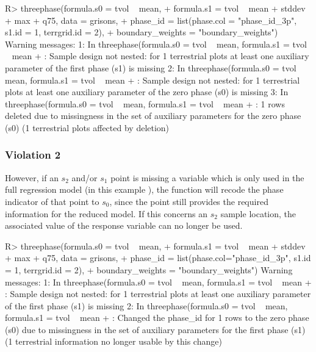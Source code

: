 \begin{small}
\begin{Schunk}
\begin{Sinput}
R> threephase(formula.s0 = tvol ~ mean, 
+    formula.s1 = tvol ~  mean + stddev + max + q75, data = grisons,
+    phase_id = list(phase.col = "phase_id_3p", s1.id = 1, terrgrid.id = 2),
+    boundary_weights = "boundary_weights")
Warning messages:
1: In threephase(formula.s0 = tvol ~ mean, formula.s1 = tvol ~ mean +  :
  Sample design not nested: for 1 terrestrial plots at least one auxiliary 
  parameter of the first phase (s1) is missing
2: In threephase(formula.s0 = tvol ~ mean, formula.s1 = tvol ~ mean +  :
  Sample design not nested: for 1 terrestrial plots at least one auxiliary 
  parameter of the zero phase (s0) is missing
3: In threephase(formula.s0 = tvol ~ mean, formula.s1 = tvol ~ mean +  :
  1 rows deleted due to missingness in the set of auxiliary parameters for the 
  zero phase (s0) (1 terrestrial plots affected by deletion)
\end{Sinput}
\end{Schunk}
\end{small}

\subsubsection*{Violation 2}

However, if an $s_2$ and/or $s_1$ point is missing a variable which is only used in the full regression model (in this example ), the function will recode the phase indicator of that point to $s_0$, since the point still provides the required information for the reduced model. If this concerns an $s_2$ sample location, the associated value of the response variable can no longer be used.

\begin{small}
\begin{Schunk}
\end{Schunk}
\end{small}

\begin{small}
\begin{Schunk}
\begin{Sinput}
R> threephase(formula.s0 = tvol ~ mean, 
+    formula.s1 = tvol ~  mean + stddev + max + q75, data = grisons,
+    phase_id = list(phase.col="phase_id_3p", s1.id = 1, terrgrid.id = 2),
+    boundary_weights = "boundary_weights")
Warning messages:
1: In threephase(formula.s0 = tvol ~ mean, formula.s1 = tvol ~ mean +  :
  Sample design not nested: for 1 terrestrial plots at least one auxiliary 
  parameter of the first phase (s1) is missing
2: In threephase(formula.s0 = tvol ~ mean, formula.s1 = tvol ~ mean +  :
  Changed the phase_id for 1 rows to the zero phase (s0) due to missingness in 
  the set of auxiliary parameters for the first phase (s1) (1 terrestrial 
  information no longer usable by this change)
\end{Sinput}
\end{Schunk}
\end{small}


